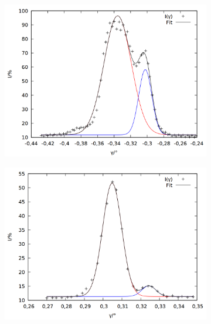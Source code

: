 \begin{figure}[h]
  \centering
  \begin{subfigure}[c]{0.49\linewidth}
  	\centering
  	\includegraphics[width=\linewidth]{data/Balmer/out_red.png}
  	\label{fig:red}
  \end{subfigure}
  \begin{subfigure}[c]{0.49\linewidth}
  	\centering
  	\includegraphics[width=\linewidth]{data/Balmer/out_lightblue.png}
  	\label{fig:lightblu}
  \end{subfigure}
  \begin{subfigure}[c]{0.49\linewidth}
  	\centering

\end{subfigure}
\end{figure}

